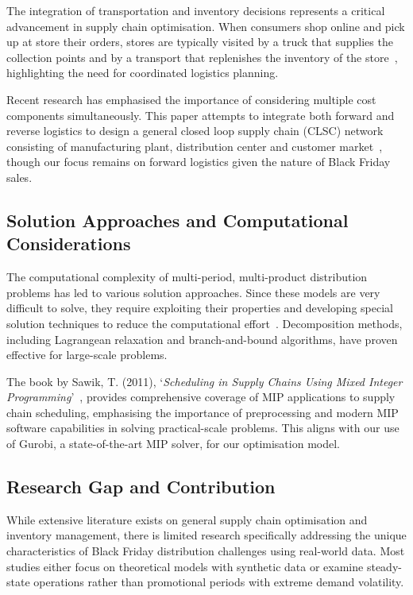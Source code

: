 \documentclass[a4paper,12pt]{article}
\begin{document}
The integration of transportation and inventory decisions represents a critical advancement in supply chain optimisation.
When consumers shop online and pick up at store their orders, stores are typically visited by a truck that supplies the collection points and by a transport that replenishes the inventory of the store~\cite{vazquez2021mixed}, highlighting the need for coordinated logistics planning.

Recent research has emphasised the importance of considering multiple cost components simultaneously.
This paper attempts to integrate both forward and reverse logistics to design a general closed loop supply chain (CLSC) network consisting of manufacturing plant, distribution center and customer market~\cite{saha2017mixed}, though our focus remains on forward logistics given the nature of Black Friday sales.

\subsection{Solution Approaches and Computational Considerations}\label{subsec:solution-approaches-and-computational-considerations}

The computational complexity of multi-period, multi-product distribution problems has led to various solution approaches.
Since these models are very difficult to solve, they require exploiting their properties and developing special solution techniques to reduce the computational effort~\cite{you2008mixed}.
Decomposition methods, including Lagrangean relaxation and branch-and-bound algorithms, have proven effective for large-scale problems.

The book by Sawik, T. (2011), `\textit{Scheduling in Supply Chains Using Mixed Integer Programming}'~\cite{sawikt2011scheduling}, provides comprehensive coverage of MIP applications to supply chain scheduling, emphasising the importance of preprocessing and modern MIP software capabilities in solving practical-scale problems.
This aligns with our use of Gurobi, a state-of-the-art MIP solver, for our optimisation model.

\subsection{Research Gap and Contribution}\label{subsec:research-gap-and-contribution}

While extensive literature exists on general supply chain optimisation and inventory management, there is limited research specifically addressing the unique characteristics of Black Friday distribution challenges using real-world data.
Most studies either focus on theoretical models with synthetic data or examine steady-state operations rather than promotional periods with extreme demand volatility.
\end{document}
